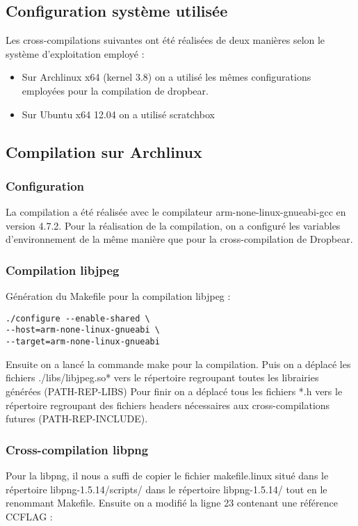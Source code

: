 \subsection{Configuration système utilisée}
Les cross-compilations suivantes ont été réalisées de deux manières selon le système d'exploitation employé : 

\begin{itemize}
\item Sur Archlinux x64 (kernel 3.8) on a utilisé les mêmes configurations employées pour la compilation de dropbear.
\item Sur Ubuntu x64 12.04 on a utilisé scratchbox %
\end{itemize}

\newpage

\subsection{Compilation sur Archlinux}

\subsubsection{Configuration}
La compilation a été réalisée avec le compilateur arm-none-linux-gnueabi-gcc en version 4.7.2.
Pour la réalisation de la compilation, on a configuré les variables d'environnement de la même manière que pour la cross-compilation de  Dropbear.


\subsubsection{Compilation libjpeg}
Génération du Makefile pour la compilation libjpeg :

\begin{lstlisting}
./configure --enable-shared \
--host=arm-none-linux-gnueabi \
--target=arm-none-linux-gnueabi
\end{lstlisting}

Ensuite on a lancé la commande make pour la compilation.
Puis on a déplacé les fichiers ./libs/libjpeg.so* vers le répertoire regroupant toutes les librairies générées (PATH-REP-LIBS)
Pour finir on a déplacé tous les fichiers *.h vers le répertoire regroupant des fichiers headers nécessaires aux cross-compilations futures (PATH-REP-INCLUDE).

\subsubsection{Cross-compilation libpng}
Pour la libpng, il nous a suffi de copier le fichier makefile.linux situé dans le répertoire libpng-1.5.14/scripts/ dans le répertoire libpng-1.5.14/ tout en le renommant Makefile. Ensuite on a modifié la ligne 23 contenant une référence CCFLAG : 

